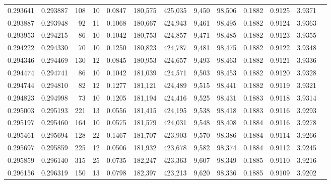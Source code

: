 \begin{tabular}{rrrrrrrrrrrrr}
0.293641 & 0.293887 &   108 &  10 &                                     0.0847 & 180,575 & 425,035 &   9,450 &  98,506 & 0.1882 & 0.9125 & 3.9371 \\
0.293887 & 0.293948 &    92 &  11 &                                     0.1068 & 180,667 & 424,943 &   9,461 &  98,495 & 0.1882 & 0.9124 & 3.9363 \\
0.293953 & 0.294215 &    86 &  10 &                                     0.1042 & 180,753 & 424,857 &   9,471 &  98,485 & 0.1882 & 0.9123 & 3.9355 \\
0.294222 & 0.294330 &    70 &  10 &                                     0.1250 & 180,823 & 424,787 &   9,481 &  98,475 & 0.1882 & 0.9122 & 3.9348 \\
0.294346 & 0.294469 &   130 &  12 &                                     0.0845 & 180,953 & 424,657 &   9,493 &  98,463 & 0.1882 & 0.9121 & 3.9336 \\
0.294474 & 0.294741 &    86 &  10 &                                     0.1042 & 181,039 & 424,571 &   9,503 &  98,453 & 0.1882 & 0.9120 & 3.9328 \\
0.294744 & 0.294810 &    82 &  12 &                                     0.1277 & 181,121 & 424,489 &   9,515 &  98,441 & 0.1882 & 0.9119 & 3.9321 \\
0.294823 & 0.294998 &    73 &  10 &                                     0.1205 & 181,194 & 424,416 &   9,525 &  98,431 & 0.1883 & 0.9118 & 3.9314 \\
0.295003 & 0.295193 &   221 &  13 &                                     0.0556 & 181,415 & 424,195 &   9,538 &  98,418 & 0.1883 & 0.9116 & 3.9293 \\
0.295197 & 0.295460 &   164 &  10 &                                     0.0575 & 181,579 & 424,031 &   9,548 &  98,408 & 0.1884 & 0.9116 & 3.9278 \\
0.295461 & 0.295694 &   128 &  22 &                                     0.1467 & 181,707 & 423,903 &   9,570 &  98,386 & 0.1884 & 0.9114 & 3.9266 \\
0.295697 & 0.295859 &   225 &  12 &                                     0.0506 & 181,932 & 423,678 &   9,582 &  98,374 & 0.1884 & 0.9112 & 3.9245 \\
0.295859 & 0.296140 &   315 &  25 &                                     0.0735 & 182,247 & 423,363 &   9,607 &  98,349 & 0.1885 & 0.9110 & 3.9216 \\
0.296156 & 0.296319 &   150 &  13 &                                     0.0798 & 182,397 & 423,213 &   9,620 &  98,336 & 0.1885 & 0.9109 & 3.9202 \\

\end{tabular}
